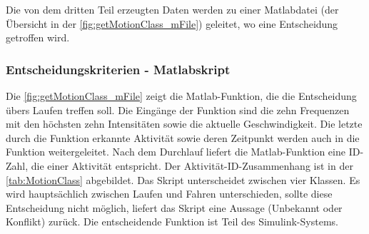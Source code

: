 Die von dem dritten Teil erzeugten Daten werden zu einer Matlab\-datei (der Übersicht in der \autoref{fig:getMotionClass_mFile}) geleitet, wo eine Entscheidung getroffen wird.
%
%
%

\subsubsection{Entscheidungskriterien - Matlabskript}
%
%
%
%
%
Die \autoref{fig:getMotionClass_mFile} zeigt die Matlab-Funktion, die die Entscheidung übers Laufen treffen soll. Die Eingänge der Funktion sind die zehn Frequenzen mit den höchsten zehn Intensitäten sowie die aktuelle Geschwindigkeit. Die letzte durch die Funktion erkannte Aktivität sowie deren Zeitpunkt werden auch in die Funktion weitergeleitet. Nach dem Durchlauf liefert die Matlab-Funktion eine ID-Zahl, die einer Aktivität entspricht. Der Aktivität-ID-Zusammenhang ist in der \autoref{tab:MotionClass} abgebildet. Das Skript unterscheidet zwischen vier Klassen. Es wird hauptsächlich zwischen Laufen und Fahren unterschieden, sollte diese Entscheidung nicht möglich, liefert das Skript eine Aussage (Unbekannt oder Konflikt) zurück.
Die entscheidende Funktion ist Teil des Simulink-Systems.

